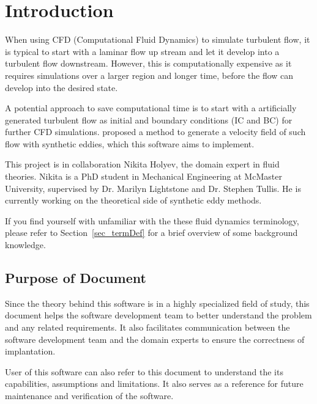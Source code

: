 \documentclass[12pt]{article}
\begin{document}
\section{Introduction}
When using CFD (Computational Fluid Dynamics) to simulate turbulent flow, it is typical to start with a laminar flow up stream and let it develop into a turbulent flow downstream. However, this is computationally expensive as it requires simulations over a larger region and longer time, before the flow can develop into the desired state. 

A potential approach to save computational time is to start with a artificially generated turbulent flow as initial and boundary conditions (IC and BC) for further CFD simulations. \citet{PolettoEtAl2013} proposed a method to generate a velocity field of such flow with synthetic eddies, which this software aims to implement.

This project is in collaboration Nikita Holyev, the domain expert in fluid theories. Nikita is a PhD student in Mechanical Engineering at McMaster University, supervised by Dr. Marilyn Lightstone and Dr. Stephen Tullis. He is currently working on the theoretical side of synthetic eddy methods.

If you find yourself with unfamiliar with the these fluid dynamics terminology, please refer to Section~\ref{sec_termDef} for a brief overview of some background knowledge.

\subsection{Purpose of Document}
Since the theory behind this software is in a highly specialized field of study, this document helps the software development team to better understand the problem and any related requirements. It also facilitates communication between the software development team and the domain experts to ensure the correctness of implantation.

User of this software can also refer to this document to understand the its capabilities, assumptions and limitations. It also serves as a reference for future maintenance and verification of the software.
\end{document}
